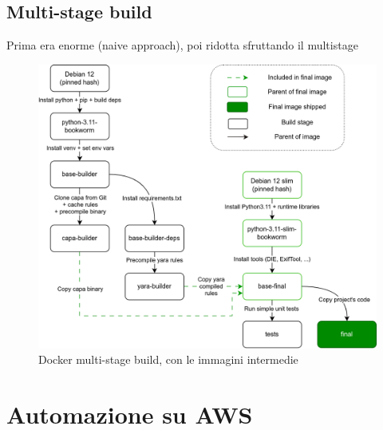 \subsection{Multi-stage build}
Prima era enorme (naive approach), poi ridotta sfruttando il multistage
\begin{figure}[H]
    \centering
    \includegraphics[width=\textwidth]{assets/dockerfile.png}
    \caption{Docker multi-stage build, con le immagini intermedie}
    \label{fig:static_dockerfile_multistage_build}
\end{figure}

\section{Automazione su AWS}

